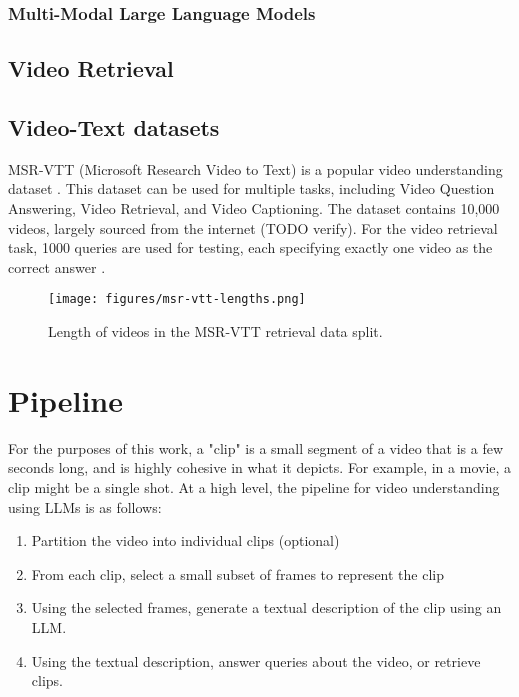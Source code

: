 \documentclass{article}
\begin{document}
\subsubsection{Multi-Modal Large Language Models}

\subsection{Video Retrieval}

\subsection{Video-Text datasets}
MSR-VTT (Microsoft Research Video to Text) is a popular video understanding dataset \cite{msr-vtt}.
This dataset can be used for multiple tasks, including Video Question Answering, Video Retrieval, and Video Captioning.
The dataset contains 10,000 videos, largely sourced from the internet (TODO verify).
For the video retrieval task, 1000 queries are used for testing, each specifying exactly one video as the correct answer \cite{jsfusion}.


\begin{figure}
      \centering
      \texttt{[image: figures/msr-vtt-lengths.png]}
      \caption{Length of videos in the MSR-VTT retrieval data split.}
      \label{fig:optical_flow}
\end{figure}

\section{Pipeline}


For the purposes of this work, a "clip" is a small segment of a video that is a few seconds long, 
and is highly cohesive in what it depicts. For example, in a movie, a clip might be a single shot.
At a high level, the pipeline for video understanding using LLMs is as follows:
\begin{enumerate}
      \item Partition the video into individual clips (optional)
      \item From each clip, select a small subset of frames to represent the clip
      \item Using the selected frames, generate a textual description of the clip using an LLM.
      \item Using the textual description, answer queries about the video, or retrieve clips.
\end{enumerate}
\end{document}
